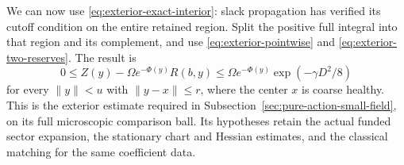We can now use \eqref{eq:exterior-exact-interior}: slack propagation
has verified its cutoff condition on the entire retained region.
Split the positive full integral into that region and its
complement, and use \eqref{eq:exterior-pointwise} and
\eqref{eq:exterior-two-reserves}. The result is
\[
 0\le Z(y)-\Omega e^{-\Phi(y)}R(b,y)
       \le\Omega e^{-\Phi(y)}\exp(-\gamma D^2/8)
\]
for every $\|y\|<u$ with $\|y-x\|\le r$, where the center $x$
is coarse healthy. This is the exterior estimate required in
Subsection~\ref{sec:pure-action-small-field}, on its full microscopic
comparison ball. Its hypotheses retain the actual funded sector
expansion, the stationary chart and Hessian estimates, and the
classical matching for the same coefficient data.
